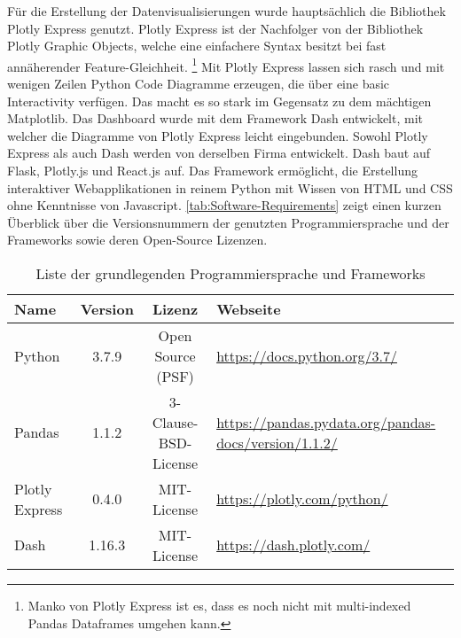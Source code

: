     
    Für die Erstellung der Datenvisualisierungen wurde  hauptsächlich die Bibliothek Plotly Express genutzt. Plotly Express ist der Nachfolger von der 
    Bibliothek Plotly Graphic Objects, welche eine einfachere Syntax besitzt bei fast annäherender Feature-Gleichheit. \footnote{Manko von Plotly Express ist es, dass es noch 
    nicht mit multi-indexed Pandas Dataframes umgehen kann.}
    Mit Plotly Express lassen sich rasch und mit wenigen Zeilen Python Code Diagramme erzeugen, die über eine basic Interactivity verfügen. Das macht es so stark im Gegensatz
    zu dem mächtigen Matplotlib.  
    Das Dashboard wurde mit dem Framework Dash entwickelt, mit welcher die Diagramme von Plotly Express leicht eingebunden. 
    Sowohl Plotly Express als auch Dash werden von derselben Firma entwickelt. Dash baut
    auf Flask, Plotly.js und React.js auf. Das Framework ermöglicht, die Erstellung interaktiver Webapplikationen 
    in reinem Python mit Wissen von HTML und CSS ohne Kenntnisse von Javascript. \autoref{tab:Software-Requirements} zeigt einen 
    kurzen Überblick über die Versionsnummern der genutzten Programmiersprache und der Frameworks sowie deren Open-Source
    Lizenzen.
    
    \begingroup
        \setlength{\tabcolsep}{4pt} %
        \renewcommand{\arraystretch}{1.5}
        \begin{table}[h]
            \centering
            \begin{adjustbox}{max width=\textwidth}
            \Huge
            \begin{tabular}{lccl}
               \toprule
               \textbf{Name}             &{Version}    &\textbf{Lizenz}                        & \textbf{Webseite}\\
               \midrule     
                    Python               &3.7.9         &Open Source (PSF)                     & \url{https://docs.python.org/3.7/}\\
                    Pandas               &1.1.2         &3-Clause-BSD-License                  & \url{https://pandas.pydata.org/pandas-docs/version/1.1.2/}\\
                    Plotly Express       &0.4.0         &MIT-License                           & \url{https://plotly.com/python/}\\
                    Dash                 &1.16.3        &MIT-License                           & \url{https://dash.plotly.com/}\\


                \bottomrule
            \end{tabular}
            \end{adjustbox}
            \caption{%
                Liste der grundlegenden Programmiersprache und Frameworks
            \label{tab:Software-Requirements}
            }
             \end{table}
        \endgroup
    
